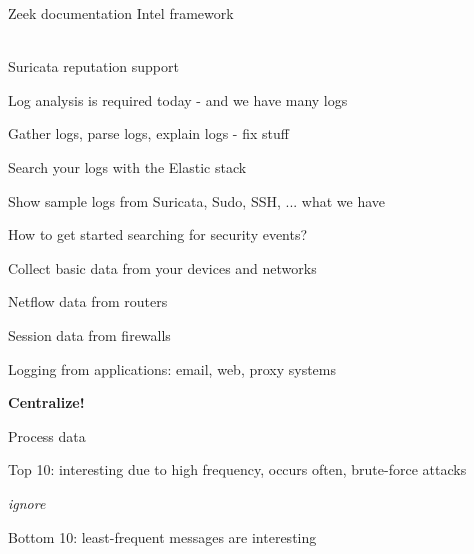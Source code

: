 \documentclass[Screen16to9,17pt]{foils}
\begin{document}

\begin{list1}
\item Zeek documentation Intel framework\\
\\
\item Suricata reputation support\\
\end{list1}



\begin{list1}
\item Log analysis is required today - and we have many logs
\item Gather logs, parse logs, explain logs - fix stuff
\item Search your logs with the Elastic stack
\item Show sample logs from Suricata, Sudo, SSH, ... what we have
\end{list1}



\begin{list1}
\item How to get started searching for security events?
\item Collect basic data from your devices and networks
\begin{list2}
\item Netflow data from routers
\item Session data from firewalls
\item Logging from applications: email, web, proxy systems
\end{list2}
\item {\bf Centralize!}
\item Process data
\begin{list2}
\item Top 10: interesting due to high frequency, occurs often, brute-force attacks
\item {\it ignore}
\item Bottom 10: least-frequent messages are interesting
\end{list2}
\end{list1}


\end{document}
